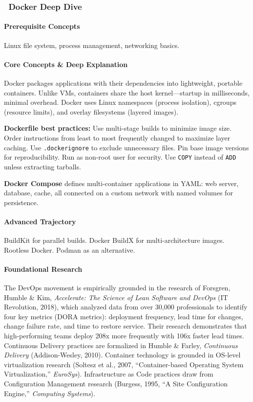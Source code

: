 \documentclass[11pt, a4paper, oneside]{report}
\newcommand{\mustmaster}[1]{\subsubsection{\texorpdfstring{\fcolorbox{blue!40!black}{blue!8}{\footnotesize\bfseries\color{blue!40!black} MUST MASTER}~#1}{#1}}}
\begin{document}
\mustmaster{Docker Deep Dive}

\paragraph{Prerequisite Concepts} Linux file system, process management, networking basics.

\paragraph{Core Concepts \& Deep Explanation} Docker packages applications with their dependencies into lightweight, portable containers. Unlike VMs, containers share the host kernel---startup in milliseconds, minimal overhead. Docker uses Linux namespaces (process isolation), cgroups (resource limits), and overlay filesystems (layered images).

\textbf{Dockerfile best practices:} Use multi-stage builds to minimize image size. Order instructions from least to most frequently changed to maximize layer caching. Use \texttt{.dockerignore} to exclude unnecessary files. Pin base image versions for reproducibility. Run as non-root user for security. Use \texttt{COPY} instead of \texttt{ADD} unless extracting tarballs.

\textbf{Docker Compose} defines multi-container applications in YAML: web server, database, cache, all connected on a custom network with named volumes for persistence.

\paragraph{Advanced Trajectory} BuildKit for parallel builds. Docker BuildX for multi-architecture images. Rootless Docker. Podman as an alternative.


\paragraph{Foundational Research} The DevOps movement is empirically grounded in the research of Forsgren, Humble \& Kim, \emph{Accelerate: The Science of Lean Software and DevOps} (IT Revolution, 2018), which analyzed data from over 30,000 professionals to identify four key metrics (DORA metrics): deployment frequency, lead time for changes, change failure rate, and time to restore service. Their research demonstrates that high-performing teams deploy 208x more frequently with 106x faster lead times. Continuous Delivery practices are formalized in Humble \& Farley, \emph{Continuous Delivery} (Addison-Wesley, 2010). Container technology is grounded in OS-level virtualization research (Soltesz et al., 2007, ``Container-based Operating System Virtualization,'' \emph{EuroSys}). Infrastructure as Code practices draw from Configuration Management research (Burgess, 1995, ``A Site Configuration Engine,'' \emph{Computing Systems}).
\end{document}
